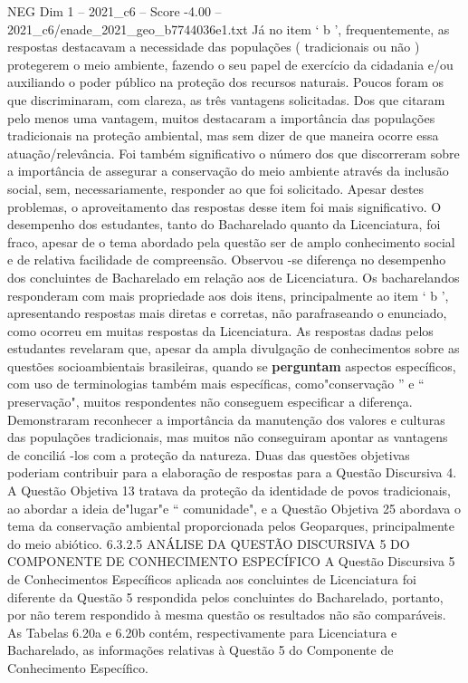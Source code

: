 \begin{textsample}{NEG Dim 1 – 2021\_c6 – Score -4.00 – 2021\_c6/enade\_2021\_geo\_b7744036e1.txt}
Já no item ‘ b ’, frequentemente, as respostas destacavam a necessidade das populações ( tradicionais ou não ) protegerem o meio ambiente, fazendo o seu papel de exercício da cidadania e/ou auxiliando o poder público na proteção dos recursos naturais.
Poucos foram os que discriminaram, com clareza, as três vantagens solicitadas.
Dos que citaram pelo menos uma vantagem, muitos destacaram a importância das populações tradicionais na proteção ambiental, mas sem dizer de que maneira ocorre essa atuação/relevância.
Foi também significativo o número dos que discorreram sobre a importância de assegurar a conservação do meio ambiente através da inclusão social, sem, necessariamente, responder ao que foi solicitado.
Apesar destes problemas, o aproveitamento das respostas desse item foi mais significativo.
O desempenho dos estudantes, tanto do Bacharelado quanto da Licenciatura, foi fraco, apesar de o tema abordado pela questão ser de amplo conhecimento social e de relativa facilidade de compreensão.
Observou -se diferença no desempenho dos concluintes de Bacharelado em relação aos de Licenciatura.
Os bacharelandos responderam com mais propriedade aos dois itens, principalmente ao item ‘ b ’, apresentando respostas mais diretas e corretas, não parafraseando o enunciado, como ocorreu em muitas respostas da Licenciatura.
As respostas dadas pelos estudantes revelaram que, apesar da ampla divulgação de conhecimentos sobre as questões socioambientais brasileiras, quando se \textbf{perguntam} aspectos específicos, com uso de terminologias também mais específicas, como"conservação ” e “ preservação", muitos respondentes não conseguem especificar a diferença.
Demonstraram reconhecer a importância da manutenção dos valores e culturas das populações tradicionais, mas muitos não conseguiram apontar as vantagens de conciliá -los com a proteção da natureza.
Duas das questões objetivas poderiam contribuir para a elaboração de respostas para a Questão Discursiva 4.
A Questão Objetiva 13 tratava da proteção da identidade de povos tradicionais, ao abordar a ideia de"lugar"e “ comunidade", e a Questão Objetiva 25 abordava o tema da conservação ambiental proporcionada pelos Geoparques, principalmente do meio abiótico. 6.3.2.5 ANÁLISE DA QUESTÃO DISCURSIVA 5 DO COMPONENTE DE CONHECIMENTO ESPECÍFICO A Questão Discursiva 5 de Conhecimentos Específicos aplicada aos concluintes de Licenciatura foi diferente da Questão 5 respondida pelos concluintes do Bacharelado, portanto, por não terem respondido à mesma questão os resultados não são comparáveis.
As Tabelas 6.20a e 6.20b contém, respectivamente para Licenciatura e Bacharelado, as informações relativas à Questão 5 do Componente de Conhecimento Específico.

\end{textsample}
